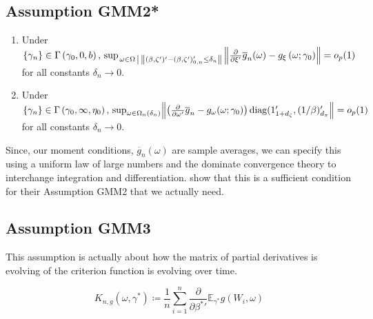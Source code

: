 \documentclass[11pt]{article}
\newcommand*{\E}{\mathbb{E}}
\DeclarePairedDelimiter\norm{\lVert}{\rVert}
\DeclareMathOperator{\diag}{diag}
\newcommand{\mvert}[1][\middle]{\ensuremath{\,#1\vert\,}}
\begin{document}
\subsection{Assumption GMM2*}


\begin{enumerate}
    \item Under $\{\gamma_n\} \in \Gamma\left(\gamma_0, 0, b\right),\, \sup_{\left. \omega \in \Omega \mvert
        \norm*{(\beta, \zeta')' - (\beta, \zeta')_{0,n}'\leq \delta_n}\right.} \norm*{\frac{\partial}{\partial \xi'}
        \overline{g}_n(\omega) - g_{\xi}\left(\omega ; \gamma_0 \right)} = o_p(1)$  for all constants $\delta_n
        \to 0$.
    \item Under $\{\gamma_n \} \in \Gamma\left(\gamma_0, \infty, \eta_0\right),\,  \sup_{\omega \in
        \Omega_{n}(\delta_n)} \norm*{\left(\frac{\partial}{\partial \omega'} \overline{g}_n - g_{\omega}(\omega ;
            \gamma_0)\right) \diag(1_{1+d_\zeta}', (1/\beta)_{d_{\pi}}'}  = o_p(1)$ for all constants $\delta_n \to 0$.
\end{enumerate}

Since, our moment conditions, $\overline{g}_n(\omega)$ are sample averages, we can specify this using a uniform
law of large numbers and the dominate convergence theory to interchange integration and differentiation.
\textcite{andrewsGmm2014} show that this is a sufficient condition for their Assumption GMM2 that we actually
need.


\subsection{Assumption GMM3}

This assumption is actually about how the matrix of partial derivatives is evolving of the criterion function is
evolving over time. 

\begin{equation}
    K_{n,g}(\omega, \gamma^{*}) \coloneqq  \frac{1}{n} \sum_{i=1}^n \frac{\partial}{\partial {\beta^{*}}'}
    \E_{\gamma^{*}} g(W_i, \omega)
\end{equation}
\end{document}

